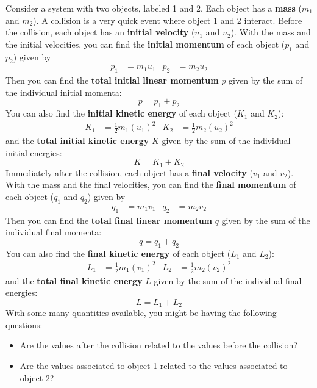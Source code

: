 Consider a system with two objects, labeled 1 and 2. Each object has a \textbf{mass} ($m_{1}$ and $m_{2}$). A collision is a very quick event where object 1 and 2 interact. Before the collision, each object has an \textbf{initial velocity} ($u_{1}$ and $u_{2}$). With the mass and the initial velocities, you can find the \textbf{initial momentum} of each object ($p_{1}$ and $p_{2}$) given by
\begin{align}
    p_{1} &= m_{1} u_{1} & p_{2} &= m_{2} u_{2}
\end{align}
Then you can find the \textbf{total initial linear momentum} $p$ given by the sum of the individual initial momenta:
\begin{equation}
    p = p_{1} + p_{2}
\end{equation}
You can also find the \textbf{initial kinetic energy} of each object ($K_{1}$ and $K_{2}$):
\begin{align}
    K_{1} &= \frac{1}{2} m_{1} \left(u_{1}\right)^{2} & K_{2} &= \frac{1}{2} m_{2} \left(u_{2}\right)^{2}
\end{align}
and the \textbf{total initial kinetic energy} $K$ given by the sum of the individual initial energies:
\begin{equation}
    K = K_{1} + K_{2}
\end{equation}
Immediately after the collision, each object has a \textbf{final velocity} ($v_{1}$ and $v_{2}$). With the mass and the final velocities, you can find the \textbf{final momentum} of each object ($q_{1}$ and $q_{2}$) given by
\begin{align}
    q_{1} &= m_{1} v_{1} & q_{2} &= m_{2} v_{2}
\end{align}
Then you can find the \textbf{total final linear momentum} $q$ given by the sum of the individual final momenta:
\begin{equation}
    q = q_{1} + q_{2}
\end{equation}
You can also find the \textbf{final kinetic energy} of each object ($L_{1}$ and $L_{2}$):
\begin{align}
    L_{1} &= \frac{1}{2} m_{1} \left(v_{1}\right)^{2} & L_{2} &= \frac{1}{2} m_{2} \left(v_{2}\right)^{2}
\end{align}
and the \textbf{total final kinetic energy} $L$ given by the sum of the individual final energies:
\begin{equation}
    L = L_{1} + L_{2}
\end{equation}
With some many quantities available, you might be having the following questions:
\begin{itemize}
    \item Are the values after the collision related to the values before the collision?
    \item Are the values associated to object 1 related to the values associated to object 2?
\end{itemize}
